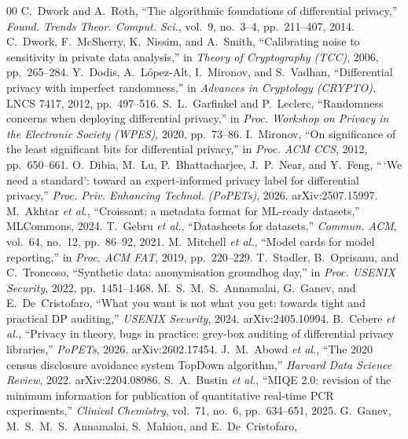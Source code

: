 \documentclass[conference]{IEEEtran}
\begin{document}
\begin{thebibliography}{00}
 C.~Dwork and A.~Roth, ``The algorithmic foundations of differential privacy,''
\emph{Found. Trends Theor. Comput. Sci.}, vol.~9, no.~3--4, pp.~211--407, 2014.
 C.~Dwork, F.~McSherry, K.~Nissim, and A.~Smith, ``Calibrating noise to
sensitivity in private data analysis,'' in \emph{Theory of Cryptography (TCC)}, 2006, pp.~265--284.
 Y.~Dodis, A.~L\'opez-Alt, I.~Mironov, and S.~Vadhan, ``Differential privacy with
imperfect randomness,'' in \emph{Advances in Cryptology (CRYPTO)}, LNCS 7417, 2012, pp.~497--516.
 S.~L.~Garfinkel and P.~Leclerc, ``Randomness concerns when deploying
differential privacy,'' in \emph{Proc. Workshop on Privacy in the Electronic Society (WPES)}, 2020,
pp.~73--86.
 I.~Mironov, ``On significance of the least significant bits for differential
privacy,'' in \emph{Proc. ACM CCS}, 2012, pp.~650--661.
 O.~Dibia, M.~Lu, P.~Bhattacharjee, J.~P.~Near, and Y.~Feng, ``\,`We need a
standard': toward an expert-informed privacy label for differential privacy,'' \emph{Proc. Priv.
Enhancing Technol. (PoPETs)}, 2026. arXiv:2507.15997.
 M.~Akhtar \emph{et al.}, ``Croissant: a metadata format for ML-ready datasets,''
MLCommons, 2024.
 T.~Gebru \emph{et al.}, ``Datasheets for datasets,'' \emph{Commun. ACM}, vol.~64,
no.~12, pp.~86--92, 2021.
 M.~Mitchell \emph{et al.}, ``Model cards for model reporting,'' in \emph{Proc.
ACM FAT\textasteriskcentered}, 2019, pp.~220--229.
 T.~Stadler, B.~Oprisanu, and C.~Troncoso, ``Synthetic data: anonymisation
groundhog day,'' in \emph{Proc. USENIX Security}, 2022, pp.~1451--1468.
 M.~S.~M.~S.~Annamalai, G.~Ganev, and E.~De~Cristofaro, ``What you want is not
what you get: towards tight and practical DP auditing,'' \emph{USENIX Security}, 2024. arXiv:2405.10994.
 B.~Cebere \emph{et al.}, ``Privacy in theory, bugs in practice: grey-box auditing
of differential privacy libraries,'' \emph{PoPETs}, 2026. arXiv:2602.17454.
 J.~M.~Abowd \emph{et al.}, ``The 2020 census disclosure avoidance system TopDown
algorithm,'' \emph{Harvard Data Science Review}, 2022. arXiv:2204.08986.
 S.~A.~Bustin \emph{et al.}, ``MIQE 2.0: revision of the minimum information for
publication of quantitative real-time PCR experiments,'' \emph{Clinical Chemistry}, vol.~71, no.~6,
pp.~634--651, 2025.
 G.~Ganev, M.~S.~M.~S.~Annamalai, S.~Mahiou, and E.~De~Cristofaro,

\end{thebibliography}
\end{document}
